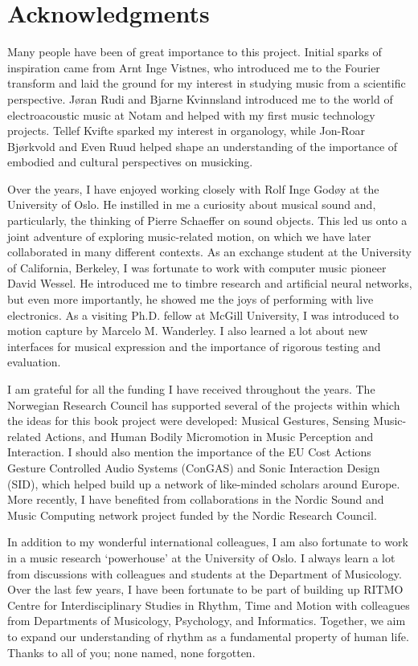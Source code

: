 \chapter*{Acknowledgments}

Many people have been of great importance to this project. Initial sparks of inspiration came from Arnt Inge Vistnes, who introduced me to the Fourier transform and laid the ground for my interest in studying music from a scientific perspective. Jøran Rudi and Bjarne Kvinnsland introduced me to the world of electroacoustic music at Notam and helped with my first music technology projects. Tellef Kvifte sparked my interest in organology, while Jon-Roar Bjørkvold and Even Ruud helped shape an understanding of the importance of embodied and cultural perspectives on musicking.

Over the years, I have enjoyed working closely with Rolf Inge Godøy at the University of Oslo. He instilled in me a curiosity about musical sound and, particularly, the thinking of Pierre Schaeffer on sound objects. This led us onto a joint adventure of exploring music-related motion, on which we have later collaborated in many different contexts. As an exchange student at the University of California, Berkeley, I was fortunate to work with computer music pioneer David Wessel. He introduced me to timbre research and artificial neural networks, but even more importantly, he showed me the joys of performing with live electronics. As a visiting Ph.D. fellow at McGill University, I was introduced to motion capture by Marcelo M. Wanderley. I also learned a lot about new interfaces for musical expression and the importance of rigorous testing and evaluation.

I am grateful for all the funding I have received throughout the years. The  Norwegian Research Council has supported several of the projects within which the ideas for this book project were developed: Musical Gestures, Sensing Music-related Actions, and Human Bodily Micromotion in Music Perception and Interaction. I should also mention the importance of the EU Cost Actions Gesture Controlled Audio Systems (ConGAS) and Sonic Interaction Design (SID), which helped build up a network of like-minded scholars around Europe. More recently, I have benefited from collaborations in the Nordic Sound and Music Computing network project funded by the Nordic Research Council.


In addition to my wonderful international colleagues, I am also fortunate to work in a music research `powerhouse' at the University of Oslo. I always learn a lot from discussions with colleagues and students at the Department of Musicology. Over the last few years, I have been fortunate to be part of building up RITMO Centre for Interdisciplinary Studies in Rhythm, Time and Motion with colleagues from Departments of Musicology, Psychology, and Informatics. Together, we aim to expand our understanding of rhythm as a fundamental property of human life. Thanks to all of you; none named, none forgotten.

